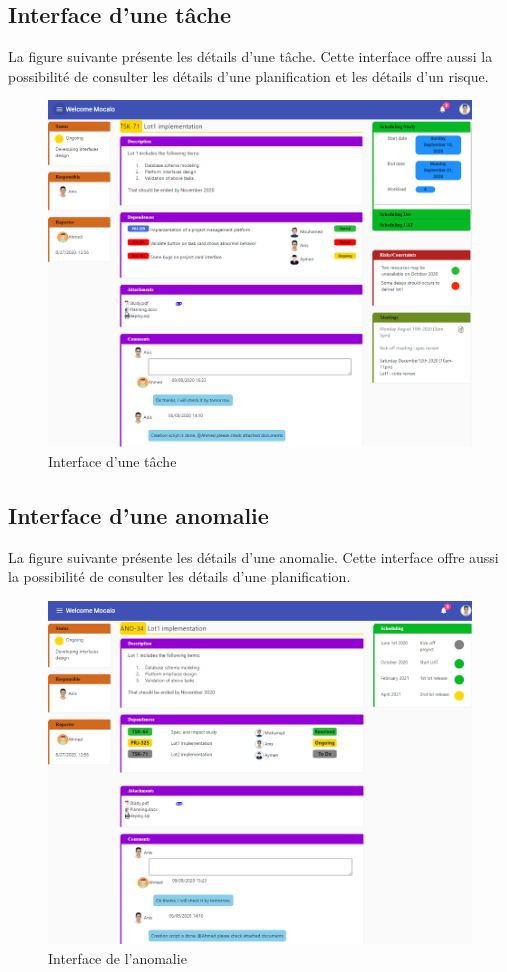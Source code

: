 \subsection{Interface d’une tâche }
\hspace{4mm}La figure suivante présente les détails d’une tâche. Cette interface offre aussi la possibilité de consulter les détails d’une planification et les détails d’un risque.
\begin{figure}[h]
    \centering
    \includegraphics{figures/33anis26.png}
    \caption{Interface d’une tâche}
    \label{fig:interface_tache}
\end{figure}\newpage
\subsection{	Interface d'une anomalie }
\hspace{4mm}La figure suivante présente les détails d’une anomalie. Cette interface offre aussi la possibilité de consulter les détails d’une planification.
\begin{figure}[h]
    \centering
    \includegraphics{figures/33anis27.png}
    \caption{Interface de l’anomalie}
    \label{fig:interface_anomalie}
\end{figure}\newpage
